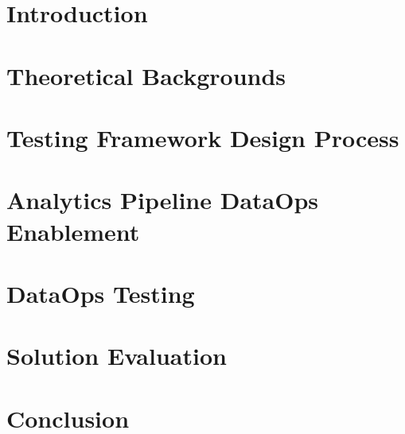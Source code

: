 	
	\chapter{Introduction}
		
		\label{chap:introduction}	

	\chapter{Theoretical Backgrounds}
		
		\label{chap:theoretical-backgrounds}

	\chapter{Testing Framework Design Process}
		
		\label{chap:testing-framework}

	\chapter{Analytics Pipeline DataOps Enablement}
		
		\label{chap:dataops-enablement}

	\chapter{DataOps Testing}
		
		\label{chap:dataops-testing}

	\chapter{Solution Evaluation}
		
		\label{chap:solution-evaluation}
	
	\chapter{Conclusion}
		
		\label{chap:conclusion}
		
		

	\pagestyle{plain}
	\clearpage
	\printbibliography
